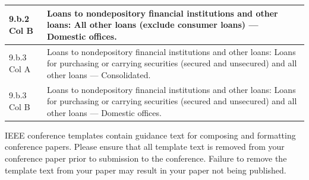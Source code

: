 \documentclass[conference]{IEEEtran}
\begin{document}
\begin{table}[htbp]
\begin{tabular}{|p{3cm}|p{12cm}|}
		\hline
		9.b.2 Col B & Loans to nondepository financial institutions and other loans: All other loans (exclude consumer loans) — Domestic offices. \\
		\hline
		9.b.3 Col A & Loans to nondepository financial institutions and other loans: Loans for purchasing or carrying securities (secured and unsecured) and all other loans — Consolidated. \\
		\hline
		9.b.3 Col B & Loans to nondepository financial institutions and other loans: Loans for purchasing or carrying securities (secured and unsecured) and all other loans — Domestic offices. \\
		\hline
	\end{tabular}
\end{table}




\vspace{12pt}
\color{red}
IEEE conference templates contain guidance text for composing and formatting conference papers. Please ensure that all template text is removed from your conference paper prior to submission to the conference. Failure to remove the template text from your paper may result in your paper not being published.
\end{document}
